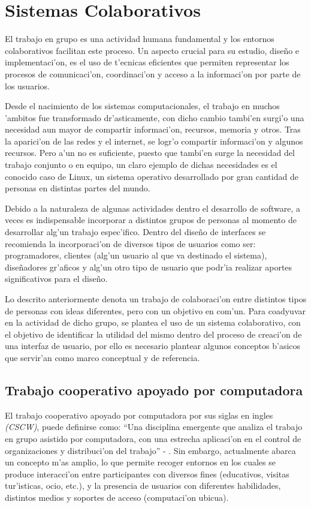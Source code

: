 \chapter{Sistemas Colaborativos}
\label{capitulodos}

El trabajo en grupo es una actividad humana fundamental y los entornos colaborativos facilitan este proceso. Un aspecto crucial para su estudio, dise\~no e implementaci'on, es el uso de t'ecnicas eficientes que permiten representar los procesos de comunicaci'on, coordinaci'on y acceso a la informaci'on por parte de los usuarios. 

\medskip
Desde el nacimiento de los sistemas computacionales, el trabajo en muchos 'ambitos fue transformado dr'asticamente, con dicho cambio tambi'en surgi'o una necesidad aun mayor de compartir informaci'on, recursos, memoria y otros. Tras la aparici'on de las redes y el internet, se logr'o compartir informaci'on y algunos recursos. Pero a'un no es suficiente, puesto que tambi'en surge la necesidad del trabajo conjunto o en equipo, un claro ejemplo de dichas necesidades es el conocido caso de Linux, un sistema operativo desarrollado por gran cantidad de personas en distintas partes del mundo.
 
\medskip
Debido a la naturaleza de algunas actividades dentro el desarrollo de software, a veces es indispensable incorporar a distintos grupos de personas al momento de desarrollar alg'un trabajo espec'ifico. Dentro del dise\~no de interfaces se recomienda la incorporaci'on de diversos tipos de usuarios como ser: programadores, clientes (alg'un usuario al que va destinado el sistema), dise\~nadores gr'aficos y alg'un otro tipo de usuario que podr'ia realizar aportes significativos para el dise\~no. 

\medskip
Lo descrito anteriormente denota un trabajo de colaboraci'on entre distintos tipos de personas con ideas diferentes, pero con un objetivo en com'un. Para coadyuvar en la actividad de dicho grupo, se plantea el uso de un sistema colaborativo, con el objetivo de identificar la utilidad del mismo dentro del proceso de creaci'on de una interfaz de usuario, por ello es necesario plantear algunos conceptos b'asicos que  servir'an como marco conceptual y de referencia.


\section{Trabajo cooperativo apoyado por computadora}

El trabajo cooperativo apoyado por computadora por sus siglas en ingles \textit{(CSCW)}, puede definirse como: ``Una disciplina emergente que analiza el trabajo en grupo asistido por computadora, con una estrecha aplicaci'on en el control de organizaciones y distribuci'on del trabajo'' - \cite{garrido2000designing}. Sin embargo, actualmente abarca un concepto m'as amplio, lo que permite recoger entornos en los cuales se produce interacci'on entre participantes con diversos fines (educativos, visitas tur'isticas, ocio, etc.), y la presencia de usuarios con diferentes habilidades, distintos medios y soportes de acceso (computaci'on ubicua).

